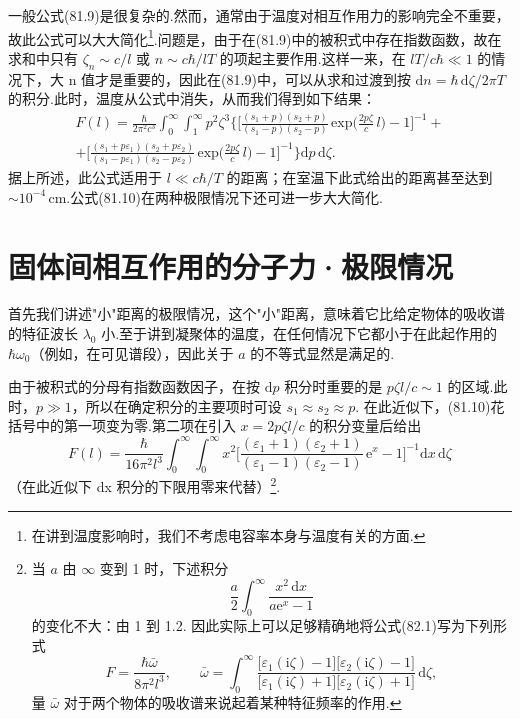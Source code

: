 一般公式(81.9)是很复杂的.然而，通常由于温度对相互作用力的影响完全不重要，故此公式可以大大简化\footnote{在讲到温度影响时，我们不考虑电容率本身与温度有关的方面.}.问题是，由于在(81.9)中的被积式中存在指数函数，故在求和中只有 $\zeta_n\sim c/l$ 或 $n\sim c\hbar/lT$ 的项起主要作用.这样一来，在 $lT/c\hbar\ll 1$ 的情况下，大 n 值才是重要的，因此在(81.9)中，可以从求和过渡到按 $\mathrm{d}n=\hbar\,\mathrm{d}\zeta/2\pi T$ 的积分.此时，温度从公式中消失，从而我们得到如下结果：
\begin{equation}
  \begin{aligned}
    F(l)=\frac{\hbar}{2\pi^{2}c^{3}}\int_{0}^{\infty}\!\!\int_{1}^{\infty}p^{2}\zeta^{3}\biggl\{\biggl[\frac{(s_1+p)(s_2+p)}{(s_1-p)(s_2-p)}\,\mathrm{exp}\biggl(\frac{2p\zeta}{c}\,l\biggr)-1\biggr]^{-1}+\\
    +\biggl[\frac{(s_1+p\varepsilon_1)(s_2+p\varepsilon_2)}{(s_1-p\varepsilon_1)(s_2-p\varepsilon_2)}\,\mathrm{exp}\biggl(\frac{2p\zeta}{c}\,l\biggr)-1\biggr]^{-1}\biggr\}\mathrm{d}p\,\mathrm{d}\zeta.
  \end{aligned}
\end{equation}
据上所述，此公式适用于 $l\ll c\hbar/T$ 的距离；在室温下此式给出的距离甚至达到 $\sim 10^{-4}\,\mathrm{cm}$.公式(81.10)在两种极限情况下还可进一步大大简化.

\section{固体间相互作用的分子力·极限情况}

首先我们讲述"小"距离的极限情况，这个"小"距离，意味着它比给定物体的吸收谱的特征波长 $\lambda_0$ 小.至于讲到凝聚体的温度，在任何情况下它都小于在此起作用的 $\hbar\omega_0$（例如，在可见谱段），因此关于 $a$ 的不等式显然是满足的.

由于被积式的分母有指数函数因子，在按 $\mathrm{d}p$ 积分时重要的是 $p\zeta l/c\sim 1$ 的区域.此时，$p\gg 1$，所以在确定积分的主要项时可设 $s_1\approx s_2\approx p$. 在此近似下，(81.10)花括号中的第一项变为零.第二项在引入 $x=2p\zeta l/c$ 的积分变量后给出
\begin{equation}
  F(l)=\frac{\hbar}{16\pi^{2}l^{3}}\int_{0}^{\infty}\!\!\int_{0}^{\infty}x^{2}\biggl[\frac{(\varepsilon_1+1)(\varepsilon_2+1)}{(\varepsilon_1-1)(\varepsilon_2-1)}\,\mathrm{e}^{x}-1\biggr]^{-1}\mathrm{d}x\,\mathrm{d}\zeta
\end{equation}
（在此近似下 dx 积分的下限用零来代替）\footnote{当 $a$ 由 $\infty$ 变到 1 时，下述积分
\begin{equation*}
  \frac{a}{2}\int_{0}^{\infty}\frac{x^{2}\,\mathrm{d}x}{a\mathrm{e}^{x}-1}
\end{equation*}
的变化不大：由 1 到 1.2. 因此实际上可以足够精确地将公式(82.1)写为下列形式
\begin{equation*}
  F=\frac{\hbar\bar{\omega}}{8\pi^{2}l^{3}},\qquad
  \bar{\omega}=\int_{0}^{\infty}\frac{\bigl[\varepsilon_1(\mathrm{i}\zeta)-1\bigr]\bigl[\varepsilon_2(\mathrm{i}\zeta)-1\bigr]}{\bigl[\varepsilon_1(\mathrm{i}\zeta)+1\bigr]\bigl[\varepsilon_2(\mathrm{i}\zeta)+1\bigr]}\,\mathrm{d}\zeta,
\end{equation*}
量 $\bar{\omega}$ 对于两个物体的吸收谱来说起着某种特征频率的作用.}.

